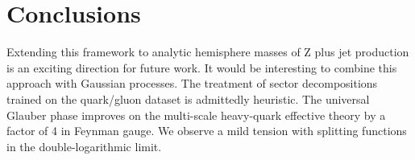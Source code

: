 \section{Conclusions}\label{sec:conclusions}

Extending this framework to analytic hemisphere masses of Z plus jet
production is an exciting direction for future work. It would be
interesting to combine this approach with Gaussian processes. The
treatment of sector decompositions trained on the quark/gluon dataset is
admittedly heuristic. The universal Glauber phase improves on the
multi-scale heavy-quark effective theory by a factor of 4 in Feynman
gauge. We observe a mild tension with splitting functions in the
double-logarithmic limit.

